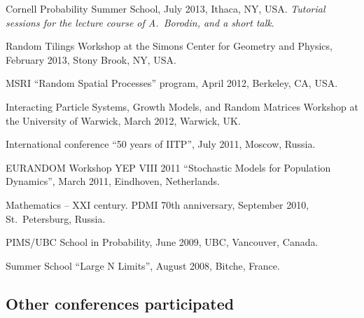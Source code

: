 \documentclass[letterpaper,11pt]{article}
\begin{document}
\begin{etaremune}
\item
Cornell Probability Summer School, July 2013, Ithaca, NY, USA.
\emph{Tutorial sessions for the lecture course of 
A.~Borodin, and a short talk}.

\item 
Random Tilings Workshop at the 
Simons Center for Geometry and Physics,
February 2013, Stony Brook, NY, USA.

\item  
MSRI ``Random Spatial Processes'' program,
April 2012, Berkeley, CA, USA.


\item 
Interacting Particle Systems, Growth Models, and Random Matrices Workshop at the University of Warwick, March 2012, Warwick, UK.


\item International conference ``50 years of IITP'', July 2011, Moscow, Russia.
  
\item EURANDOM Workshop YEP VIII 2011 ``Stochastic Models for Population Dynamics'', March 2011, Eindhoven, Netherlands.

\item Mathematics -- XXI century. PDMI 70th anniversary, September 2010, St.~Petersburg, Russia.

\item PIMS/UBC School in Probability, June 2009, UBC, Vancouver, Canada. 

\item 
Summer School ``Large N Limits'', August 2008, Bitche, France. 
\end{etaremune}

\subsection*{Other conferences participated}
\end{document}
